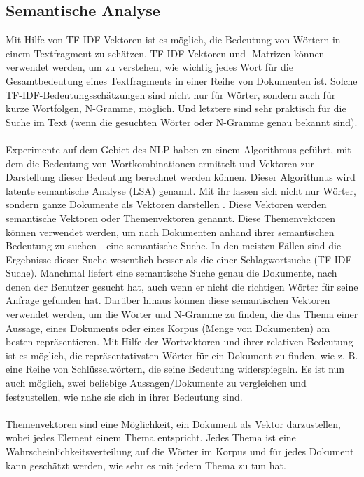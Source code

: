 \subsection{Semantische Analyse}
Mit Hilfe von \ac{TF-IDF}-Vektoren ist es möglich, die Bedeutung von Wörtern in einem Textfragment zu schätzen. 
\ac{TF-IDF}-Vektoren und -Matrizen können verwendet werden, um zu verstehen, wie wichtig jedes Wort für die Gesamtbedeutung eines Textfragments in einer Reihe von Dokumenten ist. 
Solche \ac{TF-IDF}-Bedeutungsschätzungen sind nicht nur für Wörter, sondern auch für kurze Wortfolgen, N-Gramme, möglich. 
Und letztere sind sehr praktisch für die Suche im Text (wenn die gesuchten Wörter oder N-Gramme genau bekannt sind).\\\\
Experimente auf dem Gebiet des \ac{NLP} haben zu einem Algorithmus geführt, mit dem die Bedeutung von Wortkombinationen ermittelt und Vektoren zur Darstellung dieser Bedeutung berechnet werden können. 
Dieser Algorithmus wird latente semantische Analyse (\ac{LSA}) genannt. 
Mit ihr lassen sich nicht nur Wörter, sondern ganze Dokumente als Vektoren darstellen \cite{rygl_semantic_2017}.
Diese Vektoren werden semantische Vektoren oder Themenvektoren genannt. 
Diese Themenvektoren können verwendet werden, um nach Dokumenten anhand ihrer semantischen Bedeutung zu suchen - eine semantische Suche. 
In den meisten Fällen sind die Ergebnisse dieser Suche wesentlich besser als die einer Schlagwortsuche (\ac{TF-IDF}-Suche). 
Manchmal liefert eine semantische Suche genau die Dokumente, nach denen der Benutzer gesucht hat, auch wenn er nicht die richtigen Wörter für seine Anfrage gefunden hat. 
Darüber hinaus können diese semantischen Vektoren verwendet werden, um die Wörter und N-Gramme zu finden, die das Thema einer Aussage, eines Dokuments oder eines Korpus (Menge von Dokumenten) am besten repräsentieren. 
Mit Hilfe der Wortvektoren und ihrer relativen Bedeutung ist es möglich, die repräsentativsten Wörter für ein Dokument zu finden, wie z. B. eine Reihe von Schlüsselwörtern, die seine Bedeutung widerspiegeln. 
Es ist nun auch möglich, zwei beliebige Aussagen/Dokumente zu vergleichen und festzustellen, wie nahe sie sich in ihrer Bedeutung sind. \cite{manning_foundations_1999}\\\\
Themenvektoren sind eine Möglichkeit, ein Dokument als Vektor darzustellen, wobei jedes Element einem Thema entspricht. 
Jedes Thema ist eine Wahrscheinlichkeitsverteilung auf die Wörter im Korpus und für jedes Dokument kann geschätzt werden, wie sehr es mit jedem Thema zu tun hat.
